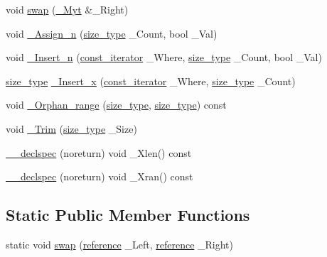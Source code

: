 \begin{DoxyCompactItemize}
void \hyperlink{classvector_3_01___bool_00_01___alloc_01_4_a5bd5ce713d5e68299b8fe3e8d58d2814}{swap} (\hyperlink{classvector_3_01___bool_00_01___alloc_01_4_ada353b682f03c458260a7f7cf361d465}{\+\_\+\+Myt} \&\+\_\+\+Right)
\item 
void \hyperlink{classvector_3_01___bool_00_01___alloc_01_4_acd24861948baa50a924b437f24b82ae8}{\+\_\+\+Assign\+\_\+n} (\hyperlink{class___vb__val_aae6aa10bcd41d235b46f128df1198612}{size\+\_\+type} \+\_\+\+Count, bool \+\_\+\+Val)
\item 
void \hyperlink{classvector_3_01___bool_00_01___alloc_01_4_aca042831876c7a7d02a54f9d63cf7276}{\+\_\+\+Insert\+\_\+n} (\hyperlink{classvector_3_01___bool_00_01___alloc_01_4_a79966c86fbbd4dcb38b01eb352633b7e}{const\+\_\+iterator} \+\_\+\+Where, \hyperlink{class___vb__val_aae6aa10bcd41d235b46f128df1198612}{size\+\_\+type} \+\_\+\+Count, bool \+\_\+\+Val)
\item 
\hyperlink{class___vb__val_aae6aa10bcd41d235b46f128df1198612}{size\+\_\+type} \hyperlink{classvector_3_01___bool_00_01___alloc_01_4_a8ef1811e956700dd89f3d915a2007238}{\+\_\+\+Insert\+\_\+x} (\hyperlink{classvector_3_01___bool_00_01___alloc_01_4_a79966c86fbbd4dcb38b01eb352633b7e}{const\+\_\+iterator} \+\_\+\+Where, \hyperlink{class___vb__val_aae6aa10bcd41d235b46f128df1198612}{size\+\_\+type} \+\_\+\+Count)
\item 
void \hyperlink{classvector_3_01___bool_00_01___alloc_01_4_ae8604e2d46563fbfa2ed79bbba975559}{\+\_\+\+Orphan\+\_\+range} (\hyperlink{class___vb__val_aae6aa10bcd41d235b46f128df1198612}{size\+\_\+type}, \hyperlink{class___vb__val_aae6aa10bcd41d235b46f128df1198612}{size\+\_\+type}) const 
\item 
void \hyperlink{classvector_3_01___bool_00_01___alloc_01_4_a619aafe2c9f87463926dd5d7f62aa917}{\+\_\+\+Trim} (\hyperlink{class___vb__val_aae6aa10bcd41d235b46f128df1198612}{size\+\_\+type} \+\_\+\+Size)
\item 
\hyperlink{classvector_3_01___bool_00_01___alloc_01_4_a778459dd62f998a3b34468c166144283}{\+\_\+\+\_\+declspec} (noreturn) void \+\_\+\+Xlen() const 
\item 
\hyperlink{classvector_3_01___bool_00_01___alloc_01_4_a714fa9f6a856d9d7ced85aea5a2c7edc}{\+\_\+\+\_\+declspec} (noreturn) void \+\_\+\+Xran() const 
\end{DoxyCompactItemize}
\subsection*{Static Public Member Functions}
\begin{DoxyCompactItemize}
\item 
static void \hyperlink{classvector_3_01___bool_00_01___alloc_01_4_aa38ac97b69b2053641fd95680200ed2e}{swap} (\hyperlink{classvector_3_01___bool_00_01___alloc_01_4_afa1a38ae57c26454f265b34ebc302830}{reference} \+\_\+\+Left, \hyperlink{classvector_3_01___bool_00_01___alloc_01_4_afa1a38ae57c26454f265b34ebc302830}{reference} \+\_\+\+Right)
\end{DoxyCompactItemize}
